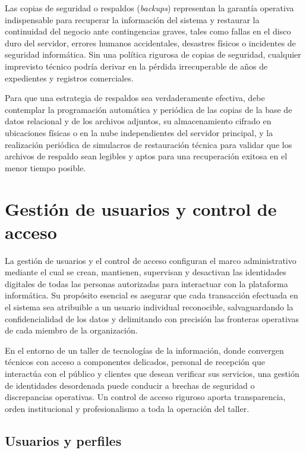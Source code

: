 Las copias de seguridad o respaldos (\textit{backups}) representan la garantía operativa indispensable para recuperar la información del sistema y restaurar la continuidad del negocio ante contingencias graves, tales como fallas en el disco duro del servidor, errores humanos accidentales, desastres físicos o incidentes de seguridad informática. Sin una política rigurosa de copias de seguridad, cualquier imprevisto técnico podría derivar en la pérdida irrecuperable de años de expedientes y registros comerciales.

Para que una estrategia de respaldos sea verdaderamente efectiva, debe contemplar la programación automática y periódica de las copias de la base de datos relacional y de los archivos adjuntos, su almacenamiento cifrado en ubicaciones físicas o en la nube independientes del servidor principal, y la realización periódica de simulacros de restauración técnica para validar que los archivos de respaldo sean legibles y aptos para una recuperación exitosa en el menor tiempo posible.

\section{Gestión de usuarios y control de acceso}

La gestión de usuarios y el control de acceso configuran el marco administrativo mediante el cual se crean, mantienen, supervisan y desactivan las identidades digitales de todas las personas autorizadas para interactuar con la plataforma informática. Su propósito esencial es asegurar que cada transacción efectuada en el sistema sea atribuible a un usuario individual reconocible, salvaguardando la confidencialidad de los datos y delimitando con precisión las fronteras operativas de cada miembro de la organización.

En el entorno de un taller de tecnologías de la información, donde convergen técnicos con acceso a componentes delicados, personal de recepción que interactúa con el público y clientes que desean verificar sus servicios, una gestión de identidades desordenada puede conducir a brechas de seguridad o discrepancias operativas. Un control de acceso riguroso aporta transparencia, orden institucional y profesionalismo a toda la operación del taller.

\subsection{Usuarios y perfiles}

